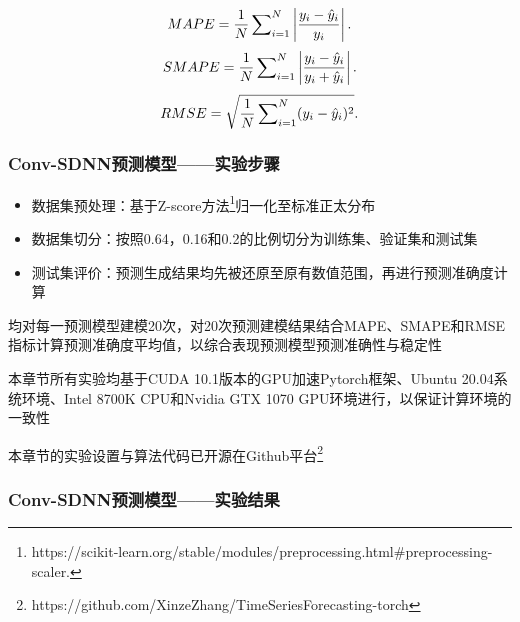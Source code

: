 \begin{frame}
\begin{figure}
\begin{minipage}[t]{0.45\textwidth}
            \begin{equation*}
                MAPE = \frac1N \sideset{}{_{i=1}^N} \sum \left \lvert\frac{y_{i} - \hat  y_{i}}{y_i} \right \rvert.
            \end{equation*}
            \begin{equation*}
                SMAPE = \frac1N \sideset{}{_{i=1}^N} \sum \left \lvert\frac{y_{i} - \hat  y_{i}}{y_i + \hat  y_{i}} \right \rvert.
            \end{equation*}
            \begin{equation*}
                RMSE = \sqrt{\frac1N \sideset{}{_{i=1}^N} \sum ({y_{i} - \hat  y_{i}})^2 }.
            \end{equation*}
        \end{minipage}
    \end{figure}
\end{frame}


\begin{frame}
    \frametitle{Conv-SDNN预测模型——实验步骤}

    \begin{itemize}
        \item 数据集预处理：基于Z-score方法\footnote{https://scikit-learn.org/stable/modules/preprocessing.html\#preprocessing-scaler.}归一化至标准正太分布
        \item 数据集切分：按照0.64，0.16和0.2的比例切分为训练集、验证集和测试集
        \item 测试集评价：预测生成结果均先被还原至原有数值范围，再进行预测准确度计算
    \end{itemize}

    均对每一预测模型建模20次，对20次预测建模结果结合MAPE、SMAPE和RMSE指标计算预测准确度平均值，以综合表现预测模型预测准确性与稳定性

    本章节所有实验均基于CUDA 10.1版本的GPU加速Pytorch框架、Ubuntu 20.04系统环境、Intel 8700K CPU和Nvidia GTX 1070 GPU环境进行，以保证计算环境的一致性

    本章节的实验设置与算法代码已开源在Github平台\footnote{https://github.com/XinzeZhang/TimeSeriesForecasting-torch}

\end{frame}

\begin{frame}
    \frametitle{Conv-SDNN预测模型——实验结果}

    

\end{frame}

